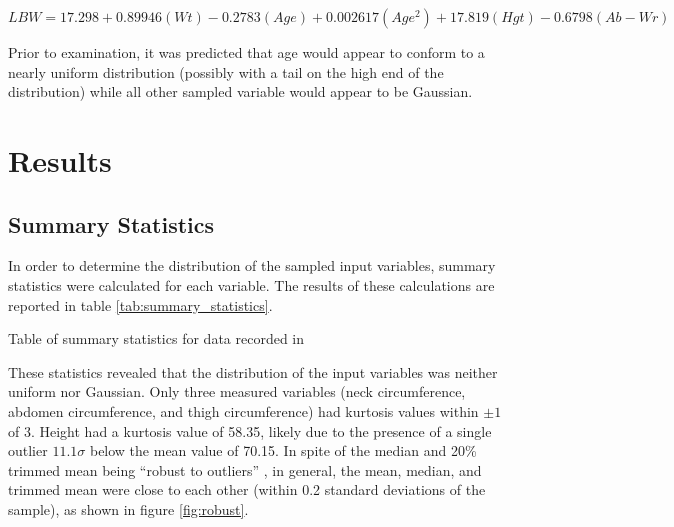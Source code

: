 \documentclass{IEEEtran}
\begin{document}
\begin{dmath}
	LBW = 17.298 + 0.89946 (Wt) - 0.2783 (Age) + 0.002617 (Age^2) + 17.819 (Hgt) - 0.6798 (Ab - Wr)
	\label{eq:brozek}
\end{dmath}

Prior to examination, it was predicted that age would appear to conform to a nearly uniform distribution (possibly with a tail on the high end of the distribution) while all other sampled variable would appear to be Gaussian. 

\section{Results}

\subsection{Summary Statistics}

In order to determine the distribution of the sampled input variables, summary statistics were calculated for each variable. The results of these calculations are reported in table \ref{tab:summary_statistics}. 

\begin{table}

\caption{Table of summary statistics for data recorded in \cite{Penrose1985}\label{tab:summary_statistics}}
\end{table}

These statistics revealed that the distribution of the input variables was neither uniform nor Gaussian. Only three measured variables (neck circumference, abdomen circumference, and thigh circumference) had kurtosis values within $\pm1$ of \num{3}. Height had a kurtosis value of \num{58.35}, likely due to the presence of a single outlier $11.1\sigma$ below the mean value of \SI{70.15}{\inch}. In spite of the median and 20\% trimmed mean being ``robust to outliers'' \cite{Coble2018}, in general, the mean, median, and trimmed mean were close to each other (within \num{0.2} standard deviations of the sample), as shown in figure \ref{fig:robust}. 
\end{document}
